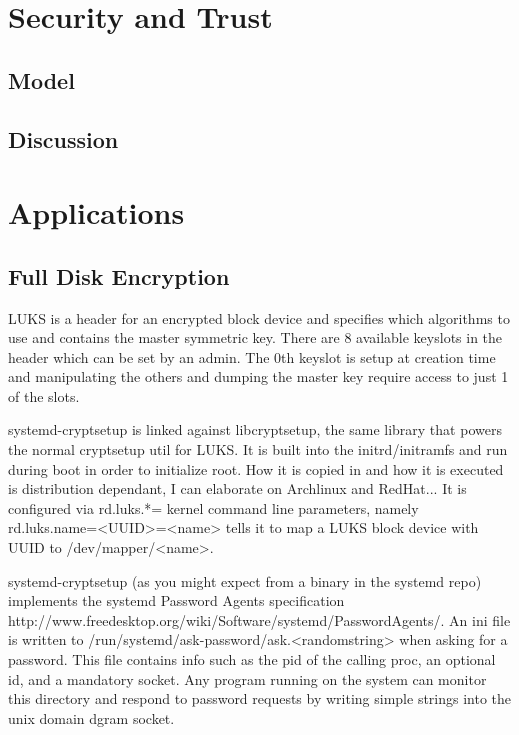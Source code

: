 \documentclass[letterpaper,twocolumn,10pt]{article}
\begin{document}



\section{Security and Trust}
\label{sec:trust}


\subsection{Model}

\subsection{Discussion}

\section{Applications}
\label{sec:apps}

\subsection{Full Disk Encryption}

LUKS is a header for an encrypted block device and specifies which algorithms to
use and contains the master symmetric key. There are 8 available keyslots in
the header which can be set by an admin. The 0th keyslot is setup at creation
time and manipulating the others and dumping the master key require access to
just 1 of the slots.

systemd-cryptsetup is linked against libcryptsetup, the same library that powers
the normal cryptsetup util for LUKS. It is built into the initrd/initramfs and
run during boot in order to initialize root. How it is copied in and how it is
executed is distribution dependant, I can elaborate on Archlinux and RedHat...
It is configured via rd.luks.*= kernel command line parameters, namely
rd.luks.name=<UUID>=<name> tells it to map a LUKS block device with UUID to
/dev/mapper/<name>.

systemd-cryptsetup (as you might expect from a binary in the systemd repo)
implements the systemd Password Agents specification
http://www.freedesktop.org/wiki/Software/systemd/PasswordAgents/. An ini file
is written to /run/systemd/ask-password/ask.<randomstring> when asking for a
password. This file contains info such as the pid of the calling proc, an
optional id, and a mandatory socket. Any program running on the system can
monitor this directory and respond to password requests by writing simple
strings into the unix domain dgram socket.
\end{document}
